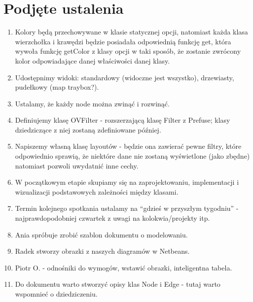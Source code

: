 \documentclass[a4paper,10pt]{article}
\begin{document}
\section{Podjęte ustalenia}
\begin{enumerate}
\item Kolory będą przechowywane w klasie statycznej opcji, natomiast każda klasa wierzchołka i krawędzi będzie posiadała odpowiednią funkcję get, która wywoła funkcję getColor z klasy opcji w taki sposób, że zostanie zwrócony kolor odpowiadające danej właściwości danej klasy. 
\item Udostępnimy widoki: standardowy (widoczne jest wszystko), drzewiasty, pudełkowy (map traybox?).
\item Ustalamy, że każdy node można zwinąć i rozwinąć.
\item Definiujemy klasę OVFilter - rozszerzającą klasę Filter z Prefuse; klasy dziedziczące z niej zostaną zdefiniowane później.
\item Napiszemy własną klasę layoutów - będzie ona zawierać pewne filtry, które odpowiednio sprawią, że niektóre dane nie zostaną wyświetlone (jako zbędne) natomiast pozwoli uwydatnić inne cechy.
\item W początkowym etapie skupiamy się na zaprojektowaniu, implementacji i wizualizacji podstawowych zależności między klasami.
\item Termin kolejnego spotkania ustalamy na ``gdzieś w przyszłym tygodniu'' - najprawdopodobniej czwartek z uwagi na kolokwia/projekty itp.
\item Ania spróbuje zrobić szablon dokumentu o modelowaniu.
\item Radek stworzy obrazki z naszych diagramów w Netbeans.
\item Piotr O. - odnośniki do wymogów, wstawić obrazki, inteligentna tabela.
\item Do dokumentu warto stworzyć opisy klas Node i Edge - tutaj warto wspomnieć o dziedziczeniu.
\end{enumerate}



\clearpage
{}
{}

\end{document}
